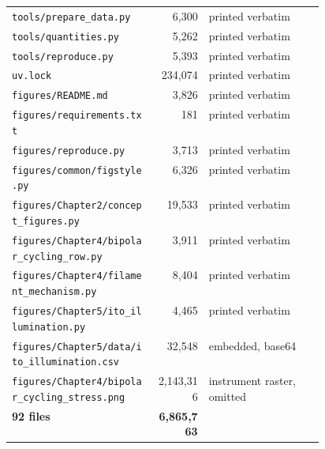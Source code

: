 \documentclass[a4paper,10pt]{article}
\begin{document}
\begin{longtable}{@{}p{0.46\linewidth} r l@{}}
\texttt{\scriptsize tools/prepare\_data.py} & 6,300 & printed verbatim \\
\texttt{\scriptsize tools/quantities.py} & 5,262 & printed verbatim \\
\texttt{\scriptsize tools/reproduce.py} & 5,393 & printed verbatim \\
\texttt{\scriptsize uv.lock} & 234,074 & printed verbatim \\
\texttt{\scriptsize figures/README.md} & 3,826 & printed verbatim \\
\texttt{\scriptsize figures/requirements.txt} & 181 & printed verbatim \\
\texttt{\scriptsize figures/reproduce.py} & 3,713 & printed verbatim \\
\texttt{\scriptsize figures/common/figstyle.py} & 6,326 & printed verbatim \\
\texttt{\scriptsize figures/Chapter2/concept\_figures.py} & 19,533 & printed verbatim \\
\texttt{\scriptsize figures/Chapter4/bipolar\_cycling\_row.py} & 3,911 & printed verbatim \\
\texttt{\scriptsize figures/Chapter4/filament\_mechanism.py} & 8,404 & printed verbatim \\
\texttt{\scriptsize figures/Chapter5/ito\_illumination.py} & 4,465 & printed verbatim \\
\texttt{\scriptsize figures/Chapter5/data/ito\_illumination.csv} & 32,548 & embedded, base64 \\
\texttt{\scriptsize figures/Chapter4/bipolar\_cycling\_stress.png} & 2,143,316 & instrument raster, omitted \\
\midrule \textbf{92 files} & \textbf{6,865,763} & \\
\end{longtable}
\end{document}
